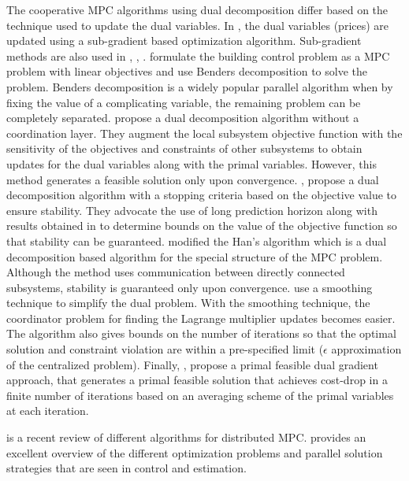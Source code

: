 The cooperative MPC algorithms using dual decomposition differ based on
the technique used to update the dual variables. In
\citet{cheng:forbes:yip:2007}, the dual variables (prices) are updated
using a sub-gradient based optimization algorithm. Sub-gradient methods
are also used in \citet{ma:anderson:borrelli:2011},
\citet{wakasa:arakawa:tanka:akashi:2008},
\citet{marcos:forbes:guay:2009}. \citet{morocan:bourdais:dumur:buisson:2011}
formulate the building control problem as a MPC problem with linear
objectives and use Benders decomposition to solve the problem. Benders
decomposition is a widely popular parallel algorithm when by fixing the
value of a complicating variable, the remaining problem can be
completely separated. \citet{scheu:marquardt:2011} propose a dual
decomposition algorithm without a coordination layer. They augment the
local subsystem objective function with the sensitivity of the
objectives and constraints of other subsystems to obtain updates for
the dual variables along with the primal variables. However, this
method generates a feasible solution only upon
convergence. \citet{giselsson:doan:keviczky:schutter:rantzer:2012}, \citet{giselsson:rantzer:2010}
propose a dual decomposition algorithm with a stopping criteria based
on the objective value to ensure stability. They advocate the use of
long prediction horizon along with results obtained in
\citet{grune:2009} to determine bounds on the value of the objective
function so that stability can be
guaranteed. \citet{doan:keviczky:necoara:diehl:schutter:2009} modified
the Han's algorithm which is a dual decomposition based algorithm for
the special structure of the MPC problem. Although the method uses
communication between directly connected subsystems, stability is
guaranteed only upon convergence. \citet{necoara:doan:suykens:2008}
use a smoothing technique to simplify the dual problem. With the
smoothing technique, the coordinator problem for finding the Lagrange
multiplier updates becomes easier. The algorithm also gives bounds on
the number of iterations so that the optimal solution and constraint
violation are within a pre-specified limit ($\epsilon$ approximation of
the centralized problem). Finally, \citet{doan:keviczky:schutter:2011}, propose a primal feasible dual
gradient approach, that generates a primal feasible solution  that
achieves cost-drop in a
finite number of iterations based on an averaging scheme of the primal
variables at each iteration. 

\citet{christofides:scattolini:pena:liu:2012} is a recent review of different algorithms for distributed
MPC. \citet{necoara:nedelcu:dumitrache:2011} provides an excellent overview of the different
optimization problems and parallel solution strategies that are seen
in control and estimation.

